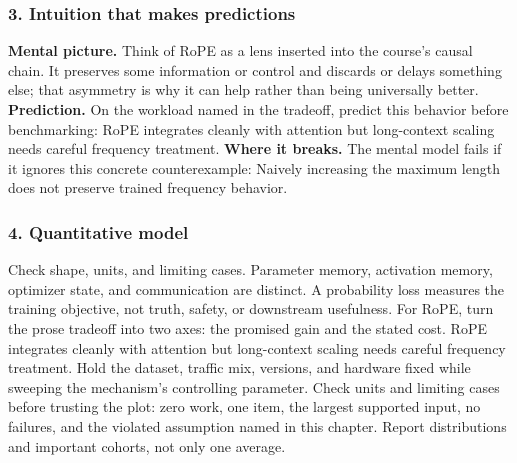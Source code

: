 \subsubsection*{3. Intuition that makes predictions}
\textbf{Mental picture.} Think of RoPE as a lens inserted into the course's causal chain. It preserves some information or control and discards or delays something else; that asymmetry is why it can help rather than being universally better.
\textbf{Prediction.} On the workload named in the tradeoff, predict this behavior before benchmarking: RoPE integrates cleanly with attention but long-context scaling needs careful frequency treatment.
\textbf{Where it breaks.} The mental model fails if it ignores this concrete counterexample: Naively increasing the maximum length does not preserve trained frequency behavior.
\subsubsection*{4. Quantitative model}
Check shape, units, and limiting cases. Parameter memory, activation memory, optimizer state, and communication are distinct. A probability loss measures the training objective, not truth, safety, or downstream usefulness.
For RoPE, turn the prose tradeoff into two axes: the promised gain and the stated cost. RoPE integrates cleanly with attention but long-context scaling needs careful frequency treatment. Hold the dataset, traffic mix, versions, and hardware fixed while sweeping the mechanism's controlling parameter.
Check units and limiting cases before trusting the plot: zero work, one item, the largest supported input, no failures, and the violated assumption named in this chapter. Report distributions and important cohorts, not only one average.
